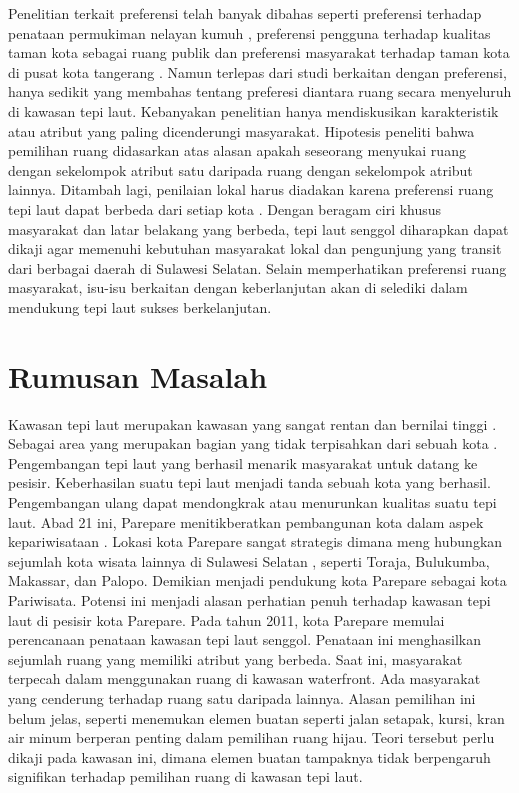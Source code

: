 \documentclass[12pt,oneside]{udthesis}\usepackage[]{graphicx}\usepackage[]{color}
\begin{document}
Penelitian terkait preferensi telah banyak dibahas seperti preferensi terhadap penataan permukiman nelayan kumuh \citep{ramdani2013}, preferensi pengguna terhadap kualitas taman kota sebagai ruang publik \citep{pratomo2017} dan  preferensi masyarakat terhadap taman kota di pusat kota tangerang \citep{imansari2015}.
Namun terlepas dari studi berkaitan dengan preferensi, hanya sedikit yang membahas tentang preferesi diantara ruang secara menyeluruh di kawasan tepi laut.
Kebanyakan penelitian hanya mendiskusikan karakteristik atau atribut yang paling dicenderungi masyarakat. Hipotesis peneliti bahwa pemilihan ruang didasarkan atas alasan apakah seseorang menyukai ruang dengan sekelompok atribut satu daripada ruang dengan sekelompok atribut lainnya.
Ditambah lagi, penilaian lokal harus diadakan karena preferensi ruang tepi laut dapat berbeda dari setiap kota \citep{madureira2018}.
Dengan beragam ciri khusus masyarakat dan latar belakang yang berbeda, tepi laut senggol diharapkan dapat dikaji agar memenuhi kebutuhan masyarakat lokal dan pengunjung yang transit dari berbagai daerah di Sulawesi Selatan.
Selain memperhatikan preferensi ruang masyarakat, isu-isu berkaitan dengan keberlanjutan akan di selediki dalam mendukung tepi laut sukses berkelanjutan.


\section{Rumusan Masalah}
Kawasan tepi laut merupakan kawasan yang sangat rentan dan bernilai tinggi \citep{mullin2000}. Sebagai area yang merupakan bagian yang tidak terpisahkan dari sebuah kota \citep{hussein2014}. Pengembangan tepi laut yang berhasil menarik masyarakat untuk datang ke pesisir. Keberhasilan suatu tepi laut menjadi tanda sebuah kota yang berhasil.
Pengembangan ulang dapat mendongkrak atau menurunkan kualitas suatu tepi laut. Abad 21 ini, Parepare menitikberatkan pembangunan kota dalam aspek kepariwisataan \citep{junaid2016,faniapriani2018,muh.sainals2020} . Lokasi kota Parepare sangat strategis dimana meng­ hubungkan sejumlah kota wisata lainnya di Sulawesi Selatan \citep{junaid2016}, seperti Toraja, Bulukumba, Makassar, dan Palopo. Demikian menjadi pendukung kota Parepare sebagai kota Pariwisata. Potensi ini menjadi alasan perhatian penuh terhadap kawasan tepi laut di pesisir kota Parepare.
Pada tahun 2011, kota Parepare memulai perencanaan penataan kawasan tepi laut senggol. Penataan ini menghasilkan sejumlah ruang yang memiliki atribut yang berbeda. Saat ini, masyarakat terpecah dalam menggunakan ruang di kawasan waterfront. Ada masyarakat yang cenderung terhadap ruang satu daripada lainnya. Alasan pemilihan ini belum jelas, seperti \cite{campagnaro2020} menemukan elemen buatan seperti jalan setapak, kursi, kran air minum berperan penting dalam pemilihan ruang hijau. Teori tersebut perlu dikaji pada kawasan ini, dimana elemen buatan tampaknya tidak berpengaruh signifikan terhadap pemilihan ruang di kawasan tepi laut.
\end{document}

